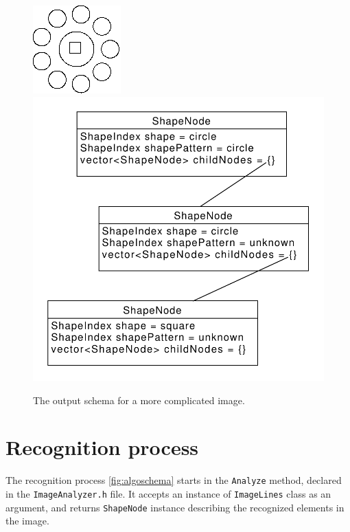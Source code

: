 \begin{description}
\begin{figure}[p]
\centering
\includegraphics[width=.3\linewidth]{ext/images/example_output1.png}
\quad
\includegraphics[width=.3\linewidth]{ext/images/example_output1.pdf}
\caption{The output schema for a more complicated image. }
\label{fig:output1}
\end{figure}


\end{description}

\section{Recognition process}
The recognition process \ref{fig:algoschema}  starts in the \texttt{Analyze} method, declared in the \texttt{ImageAnalyzer.h} file. It accepts an instance of \texttt{ImageLines} class as an argument, and returns \texttt{ShapeNode} instance describing the recognized elements in the image.

